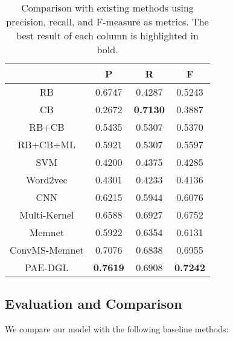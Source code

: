 \documentclass[letterpaper]{article} \usepackage{aaai19}  \usepackage{times}  \usepackage{helvet}  \usepackage{courier}  \usepackage{url}  \usepackage{graphicx}  \frenchspacing  \setlength{\pdfpagewidth}{8.5in}  \setlength{\pdfpageheight}{11in}  \setcounter{secnumdepth}{0}
\begin{document}
\begin{table}
	
	\centering
	\caption{\label{font-table} Comparison with existing methods using precision, recall, and F-measure as metrics. The best result of each column is highlighted in bold. }
	\begin{tabular} {c|c|c|c}
		\hline    & P & R & F\\
		\hline
		RB & 0.6747 & 0.4287 & 0.5243 \\
		CB & 0.2672 & \textbf{0.7130} & 0.3887 \\
		RB+CB & 0.5435 & 0.5307 & 0.5370 \\
		RB+CB+ML & 0.5921 & 0.5307 & 0.5597 \\
		SVM & 0.4200 & 0.4375 & 0.4285 \\
		Word2vec & 0.4301 & 0.4233 & 0.4136 \\
		CNN & 0.6215 & 0.5944 & 0.6076 \\
		Multi-Kernel & 0.6588 & 0.6927 & 0.6752 \\
		Memnet & 0.5922 & 0.6354 & 0.6131 \\
		ConvMS-Memnet & 0.7076 & 0.6838 & 0.6955 \\
		\hline
		PAE-DGL & \textbf{0.7619} & 0.6908 & \textbf{0.7242} \\
		\hline
	\end{tabular}
	\label{tab:table1}
\end{table}

\subsection{Evaluation and Comparison}

We compare our model with the following baseline methods:
\end{document}
